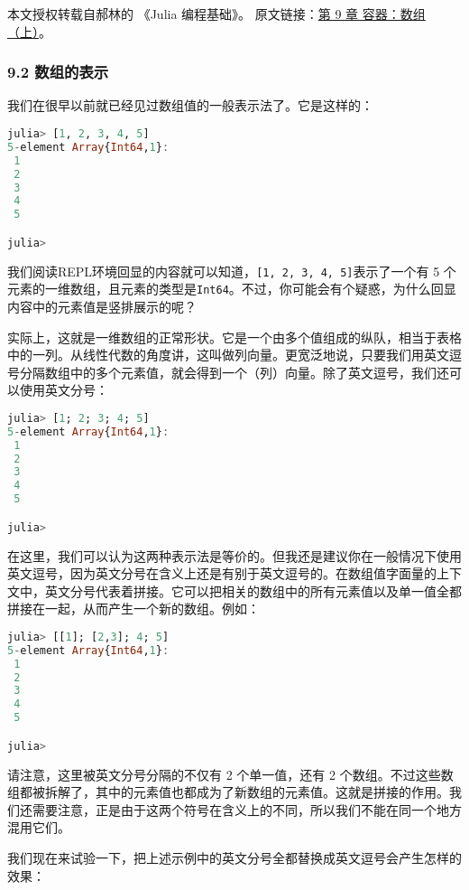
本文授权转载自郝林的 《Julia 编程基础》。 原文链接：\href{https://github.com/hyper0x/JuliaBasics/blob/master/book/ch09.md}{第 9 章 容器：数组（上）}。


\subsubsection{9.2 数组的表示}

我们在很早以前就已经见过数组值的一般表示法了。它是这样的：

\begin{lstlisting}[language=julia]
julia> [1, 2, 3, 4, 5]
5-element Array{Int64,1}:
 1
 2
 3
 4
 5

julia> 
\end{lstlisting}

我们阅读REPL环境回显的内容就可以知道，\verb|[1, 2, 3, 4, 5]|表示了一个有 5 个元素的一维数组，且元素的类型是\verb|Int64|。不过，你可能会有个疑惑，为什么回显内容中的元素值是竖排展示的呢？

实际上，这就是一维数组的正常形状。它是一个由多个值组成的纵队，相当于表格中的一列。从线性代数的角度讲，这叫做列向量。更宽泛地说，只要我们用英文逗号分隔数组中的多个元素值，就会得到一个（列）向量。除了英文逗号，我们还可以使用英文分号：

\begin{lstlisting}[language=julia]
julia> [1; 2; 3; 4; 5]
5-element Array{Int64,1}:
 1
 2
 3
 4
 5

julia> 
\end{lstlisting}

在这里，我们可以认为这两种表示法是等价的。但我还是建议你在一般情况下使用英文逗号，因为英文分号在含义上还是有别于英文逗号的。在数组值字面量的上下文中，英文分号代表着拼接。它可以把相关的数组中的所有元素值以及单一值全都拼接在一起，从而产生一个新的数组。例如：

\begin{lstlisting}[language=julia]
julia> [[1]; [2,3]; 4; 5]
5-element Array{Int64,1}:
 1
 2
 3
 4
 5

julia>
\end{lstlisting}

请注意，这里被英文分号分隔的不仅有 2 个单一值，还有 2 个数组。不过这些数组都被拆解了，其中的元素值也都成为了新数组的元素值。这就是拼接的作用。我们还需要注意，正是由于这两个符号在含义上的不同，所以我们不能在同一个地方混用它们。

我们现在来试验一下，把上述示例中的英文分号全都替换成英文逗号会产生怎样的效果：

